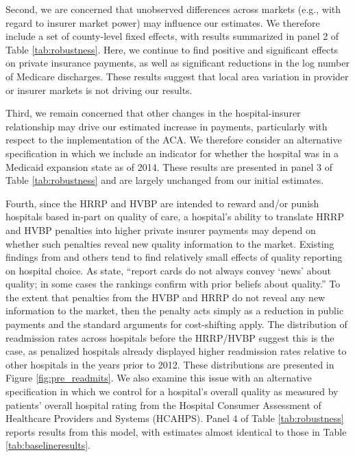 \documentclass[12pt]{article}
\begin{document}
Second, we are concerned that unobserved differences across markets (e.g., with regard to insurer market power) may influence our estimates. We therefore include a set of county-level fixed effects, with results summarized in panel 2 of Table \ref{tab:robustness}. Here, we continue to find positive and significant effects on private insurance payments, as well as significant reductions in the log number of Medicare discharges. These results suggest that local area variation in provider or insurer markets is not driving our results.

Third, we remain concerned that other changes in the hospital-insurer relationship may drive our estimated increase in payments, particularly with respect to the implementation of the ACA. We therefore consider an alternative specification in which we include an indicator for whether the hospital was in a Medicaid expansion state as of 2014. These results are presented in panel 3 of Table \ref{tab:robustness} and are largely unchanged from our initial estimates.

Fourth, since the HRRP and HVBP are intended to reward and/or punish hospitals based in-part on quality of care, a hospital's ability to translate HRRP and HVBP penalties into higher private insurer payments may depend on whether such penalties reveal new quality information to the market. Existing findings from \cite{dranove2008} and others tend to find relatively small effects of quality reporting on hospital choice. As \cite{dranove2008} state, ``report cards do not always convey `news' about quality; in some cases the rankings confirm with prior beliefs about quality.'' To the extent that penalties from the HVBP and HRRP do not reveal any new information to the market, then the penalty acts simply as a reduction in public payments and the standard arguments for cost-shifting apply. The distribution of readmission rates across hospitals before the HRRP/HVBP suggest this is the case, as penalized hospitals already displayed higher readmission rates relative to other hospitals in the years prior to 2012. These distributions are presented in Figure \ref{fig:pre_readmits}. We also examine this issue with an alternative specification in which we control for a hospital's overall quality as measured by patients' overall hospital rating from the Hospital Consumer Assessment of Healthcare Providers and Systems (HCAHPS).  Panel 4 of Table \ref{tab:robustness} reports results from this model, with estimates almost identical to those in Table \ref{tab:baselineresults}.
\end{document}
